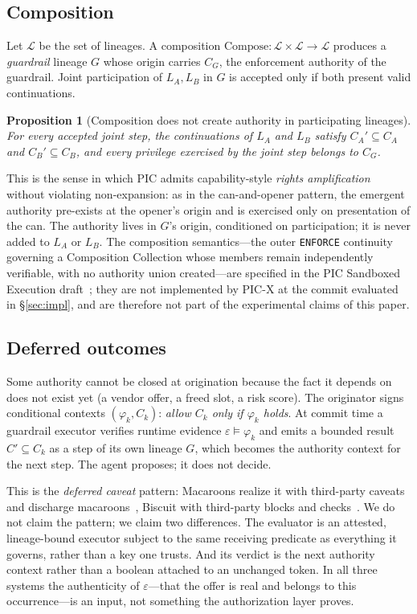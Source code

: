 \documentclass[conference]{IEEEtran}
\newcommand{\Lin}{\mathcal{L}}
\newtheorem{proposition}{Proposition}
\begin{document}
\subsection{Composition}
Let $\Lin$ be the set of lineages. A composition $\mathrm{Compose}:\Lin\times\Lin\to\Lin$ produces a \emph{guardrail} lineage $G$ whose origin carries $C_G$, the enforcement authority of the guardrail. Joint participation of $L_A,L_B$ in $G$ is accepted only if both present valid continuations.

\begin{proposition}[Composition does not create authority in participating lineages]\label{prop:compose}
For every accepted joint step, the continuations of $L_A$ and $L_B$ satisfy $C_A'\subseteq C_A$ and $C_B'\subseteq C_B$, and every privilege exercised by the joint step belongs to $C_G$.
\end{proposition}

This is the sense in which PIC admits capability-style \emph{rights amplification}~\cite{miller2003} without violating non-expansion: as in the can-and-opener pattern, the emergent authority pre-exists at the opener's origin and is exercised only on presentation of the can. The authority lives in $G$'s origin, conditioned on participation; it is never added to $L_A$ or $L_B$. The composition semantics---the outer \texttt{ENFORCE} continuity governing a Composition Collection whose members remain independently verifiable, with no authority union created---are specified in the PIC Sandboxed Execution draft~\cite{picsandbox}; they are not implemented by PIC-X at the commit evaluated in \S\ref{sec:impl}, and are therefore not part of the experimental claims of this paper.

\subsection{Deferred outcomes}
Some authority cannot be closed at origination because the fact it depends on does not exist yet (a vendor offer, a freed slot, a risk score). The originator signs conditional contexts $(\varphi_k,C_k)$: \emph{allow $C_k$ only if $\varphi_k$ holds}. At commit time a guardrail executor verifies runtime evidence $\varepsilon\models\varphi_k$ and emits a bounded result $C'\subseteq C_k$ as a step of its own lineage $G$, which becomes the authority context for the next step. The agent proposes; it does not decide.

This is the \emph{deferred caveat} pattern: Macaroons realize it with third-party caveats and discharge macaroons~\cite{macaroons}, Biscuit with third-party blocks and checks~\cite{biscuit}. We do not claim the pattern; we claim two differences. The evaluator is an attested, lineage-bound executor subject to the same receiving predicate as everything it governs, rather than a key one trusts. And its verdict is the next authority context rather than a boolean attached to an unchanged token. In all three systems the authenticity of $\varepsilon$---that the offer is real and belongs to this occurrence---is an input, not something the authorization layer proves.
\end{document}
